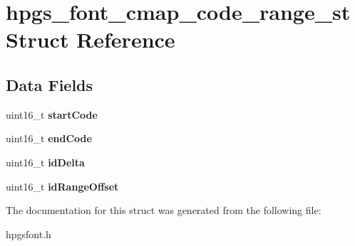 \section{hpgs\_\-font\_\-cmap\_\-code\_\-range\_\-st Struct Reference}
\label{structhpgs__font__cmap__code__range__st}
\subsection*{Data Fields}
\begin{DoxyCompactItemize}
\item 
uint16\_\-t {\bfseries startCode}\label{structhpgs__font__cmap__code__range__st_a519e8f91a3a675ab886c22d411a86844}

\item 
uint16\_\-t {\bfseries endCode}\label{structhpgs__font__cmap__code__range__st_a182bd9e0aaa65c5e59b15fa88db8399d}

\item 
uint16\_\-t {\bfseries idDelta}\label{structhpgs__font__cmap__code__range__st_a3178f71f4882af1e6bdcd590320bceef}

\item 
uint16\_\-t {\bfseries idRangeOffset}\label{structhpgs__font__cmap__code__range__st_aa7dbcc06e4879d9a9e6470a9dd189c10}

\end{DoxyCompactItemize}


The documentation for this struct was generated from the following file:\begin{DoxyCompactItemize}
\item 
hpgsfont.h\end{DoxyCompactItemize}

